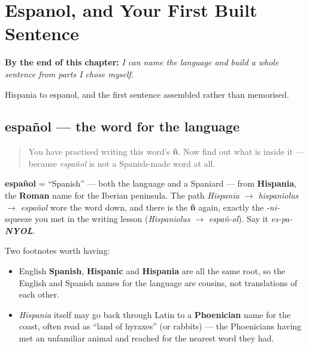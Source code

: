
\chapter{Espanol, and Your First Built Sentence}
\label{ch:spanish-espanol}

\begin{chapteropening}
\textbf{By the end of this chapter:} \emph{I can name the language and build a whole sentence from parts I chose myself.}

Hispania to espanol, and the first sentence assembled rather than memorised.
\end{chapteropening}

\section[español]{español — the word for the language}

\label{lesson:ES-C06-espanol}



\begin{quote}
You have practised writing this word's \textbf{ñ}. Now find out what is inside it — because \emph{español} is not a Spanish-made word at all.
\end{quote}

\begin{cousinweb}
\textbf{español} = \textquotedblleft{}Spanish\textquotedblright{} — both the language and a Spaniard — from \textbf{Hispania}, the \textbf{Roman} name for the Iberian peninsula. The path \emph{Hispania $\to$ hispaniolus $\to$ español} wore the word down, and there is the \textbf{ñ} again, exactly the \emph{-ni-} squeeze you met in the writing lesson (\emph{Hispaniolus} $\to$ \emph{españ-ol}). Say it \emph{es-pa-\textbf{NYOL}}.

Two footnotes worth having:

\begin{itemize}
\raggedright
  \item English \textbf{Spanish}, \textbf{Hispanic} and \textbf{Hispania} are all the same root, so the English and Spanish names for the language are cousins, not translations of each other.
  \item \emph{Hispania} itself may go back through Latin to a \textbf{Phoenician} name for the coast, often read as \textquotedblleft{}land of hyraxes\textquotedblright{} (or rabbits) — the Phoenicians having met an unfamiliar animal and reached for the nearest word they had.
\end{itemize}
\end{cousinweb}

